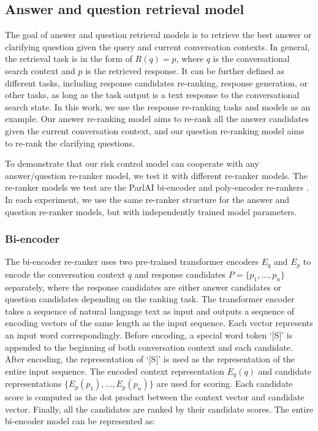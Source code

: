 \documentclass[format=acmsmall, review=False, screen=true]{acmart}
\begin{document}
\subsection{Answer and question retrieval model}
The goal of answer and question retrieval models is to retrieve the best answer or clarifying question given the query and current conversation contexts. In general, the retrieval task is in the form of $R(q) = p$, where $q$ is the conversational search context and $p$ is the retrieved response. It can be further defined as different tasks, including response candidates re-ranking, response generation, or other tasks, as long as the task output is a text response to the conversational search state. In this work, we use the response re-ranking tasks and models as an example. Our answer re-ranking model aims to re-rank all the answer candidates given the current conversation context, and our question re-ranking model aims to re-rank the clarifying questions.

To demonstrate that our risk control model can cooperate with any answer/question re-ranker model, we test it with different re-ranker models. The re-ranker models we test are the ParlAI bi-encoder and poly-encoder re-rankers \cite{polyencoder}. In each experiment, we use the same re-ranker structure for the answer and question re-ranker models, but with independently trained model parameters.

\subsubsection{\textbf{Bi-encoder}}

The bi-encoder re-ranker uses two pre-trained transformer \cite{bert} encoders $E_q$ and $E_p$ to encode the conversation context $q$ and response candidates $P=\{p_1,...,p_n\}$ separately, where the response candidates are either answer candidates or question candidates depending on the ranking task. The transformer encoder takes a sequence of natural language text as input and outputs a sequence of encoding vectors of the same length as the input sequence. Each vector represents an input word correspondingly. Before encoding, a special word token `[S]' is appended to the beginning of both conversation context and each candidate. After encoding, the representation of `[S]' is used as the representation of the entire input sequence. The encoded context representation $E_q(q)$ and candidate representations $\{E_p(p_1), ..., E_p(p_n)\}$ are used for scoring. Each candidate score is computed as the dot product between the context vector and candidate vector. Finally, all the candidates are ranked by their candidate scores. The entire bi-encoder model can be represented as:
\end{document}
